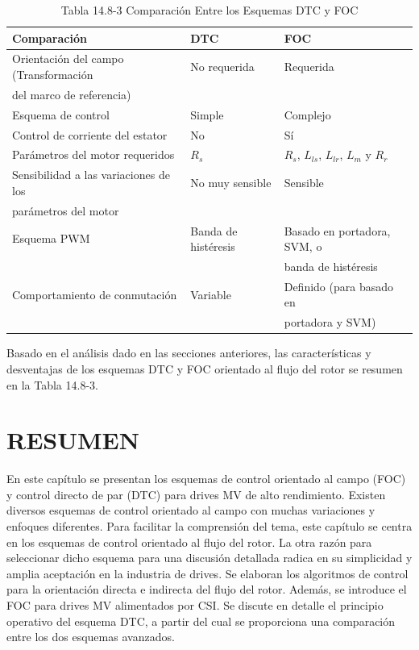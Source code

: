 \documentclass[letterpaper,12pt]{article}
\begin{document}
\begin{table}[h]
    \centering
    \caption{Tabla 14.8-3 Comparación Entre los Esquemas DTC y FOC}
    \begin{tabular}{l l l}
        \hline
        \textbf{Comparación} & \textbf{DTC} & \textbf{FOC} \\
        \hline
        Orientación del campo (Transformación & No requerida & Requerida \\
        del marco de referencia) & & \\
        Esquema de control & Simple & Complejo \\
        Control de corriente del estator & No & Sí \\
        Parámetros del motor requeridos & $R_s$ & $R_s$, $L_{ls}$, $L_{lr}$, $L_m$ y $R_r$ \\
        Sensibilidad a las variaciones de los & No muy sensible & Sensible \\
        parámetros del motor & & \\
        Esquema PWM & Banda de histéresis & Basado en portadora, SVM, o \\
        & & banda de histéresis \\
        Comportamiento de conmutación & Variable & Definido (para basado en \\
        & & portadora y SVM) \\
        \hline
    \end{tabular}
    
    \label{table:14.8-3}
\end{table}
\FloatBarrier

Basado en el análisis dado en las secciones anteriores, las características y desventajas de los esquemas DTC y FOC orientado al flujo del rotor se resumen en la Tabla 14.8-3.

\clearpage
\section{RESUMEN}

En este capítulo se presentan los esquemas de control orientado al campo (FOC) y control directo de par (DTC) para drives MV de alto rendimiento. Existen diversos esquemas de control orientado al campo con muchas variaciones y enfoques diferentes. Para facilitar la comprensión del tema, este capítulo se centra en los esquemas de control orientado al flujo del rotor. La otra razón para seleccionar dicho esquema para una discusión detallada radica en su simplicidad y amplia aceptación en la industria de drives. Se elaboran los algoritmos de control para la orientación directa e indirecta del flujo del rotor. Además, se introduce el FOC para drives MV alimentados por CSI. Se discute en detalle el principio operativo del esquema DTC, a partir del cual se proporciona una comparación entre los dos esquemas avanzados.
\end{document}
